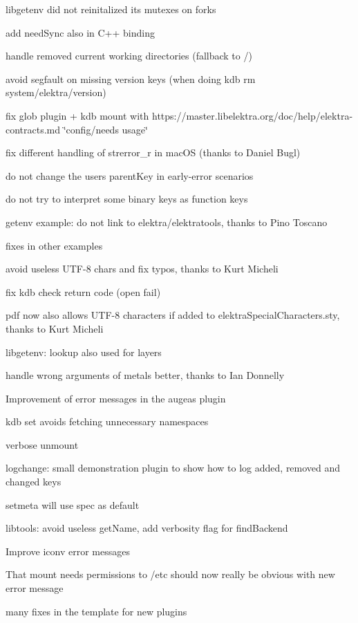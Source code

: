 \begin{DoxyItemize}
\item libgetenv did not reinitalized its mutexes on forks
\item add need\+Sync also in C++ binding
\item handle removed current working directories (fallback to /)
\item avoid segfault on missing version keys (when doing {\ttfamily kdb rm system/elektra/version})
\item fix glob plugin + kdb mount with https\+://master.libelektra.\+org/doc/help/elektra-\/contracts.md \char`\"{}config/needs usage\char`\"{}
\item fix different handling of strerror\+\_\+r in mac\+OS (thanks to Daniel Bugl)
\item do not change the users parent\+Key in early-\/error scenarios
\item do not try to interpret some binary keys as function keys
\end{DoxyItemize}


\begin{DoxyItemize}
\item getenv example\+: do not link to elektra/elektratools, thanks to Pino Toscano
\item fixes in other examples
\item avoid useless U\+T\+F-\/8 chars and fix typos, thanks to Kurt Micheli
\item fix kdb check return code (open fail)
\item pdf now also allows U\+T\+F-\/8 characters if added to elektra\+Special\+Characters.\+sty, thanks to Kurt Micheli
\item libgetenv\+: lookup also used for layers
\item handle wrong arguments of metals better, thanks to Ian Donnelly
\item Improvement of error messages in the augeas plugin
\item {\ttfamily kdb set} avoids fetching unnecessary namespaces
\item verbose unmount
\item logchange\+: small demonstration plugin to show how to log added, removed and changed keys
\item setmeta will use spec as default
\item libtools\+: avoid useless get\+Name, add verbosity flag for find\+Backend
\item Improve iconv error messages
\item That mount needs permissions to /etc should now really be obvious with new error message
\item many fixes in the template for new plugins
\end{DoxyItemize}

